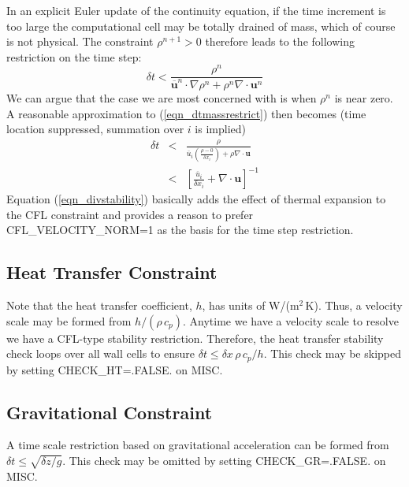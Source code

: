 In an explicit Euler update of the continuity equation, if the time increment is too large the computational cell may be totally drained of mass, which of course is not physical. The constraint $\rho^{n+1}>0$ therefore leads to the following restriction on the time step:
\begin{equation}
\label{eqn_dtmassrestrict}
\delta t < \frac{\rho^n}{\overline{\mathbf{u}}^n\cdot\nabla\rho^n + \rho^n \nabla\cdot\mathbf{u}^n}
\end{equation}
We can argue that the case we are most concerned with is when $\rho^n$ is near zero.  A reasonable approximation to (\ref{eqn_dtmassrestrict}) then becomes (time location suppressed, summation over $i$ is implied)
\begin{eqnarray}
\label{eqn_divstability}
\delta t &<& \frac{\rho}{\overline{u}_i \left(\frac{\rho-0}{\delta x_i}\right) + \rho \nabla\cdot\mathbf{u}} \nonumber\\
&<& \left[ \frac{\overline{u}_i}{\delta x_i} + \nabla\cdot\mathbf{u} \right]^{-1}
\end{eqnarray}
Equation (\ref{eqn_divstability}) basically adds the effect of thermal expansion to the CFL constraint and provides a reason to prefer {\ct CFL\_VELOCITY\_NORM=1} as the basis for the time step restriction.

\subsection{Heat Transfer Constraint}

Note that the heat transfer coefficient, $h$, has units of W/(m$^2$\,K).  Thus, a velocity scale may be formed from $h/(\rho\, c_p)$.  Anytime we have a velocity scale to resolve we have a CFL-type stability restriction.  Therefore, the heat transfer stability check loops over all wall cells to ensure $\delta t \le \delta x \,\rho \,c_p/h$.  This check may be skipped by setting {\ct CHECK\_HT=.FALSE.} on {\ct MISC}.

\subsection{Gravitational Constraint}

A time scale restriction based on gravitational acceleration can be formed from $\delta t \le \sqrt{\delta z/g}$.  This check may be omitted by setting  {\ct CHECK\_GR=.FALSE.} on {\ct MISC}.

